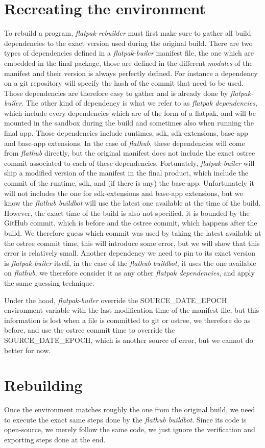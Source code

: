 \documentclass[a4paper,11pt,oneside]{report}
\newcommand{\sysname}{\emph{flatpak-rebuilder}\xspace}
\newcommand{\fh}{\emph{flathub}\xspace}
\newcommand{\fb}{\emph{flatpak-builer}\xspace}
\newcommand{\fdp}{\emph{flatpak dependencies}\xspace}
\newcommand{\sde}{SOURCE\_DATE\_EPOCH\xspace}
\newcommand{\fhbb}{\emph{flathub buildbot}\xspace}
\begin{document}
\section{Recreating the environment}
To rebuild a program, \sysname must first make sure to gather all build
dependencies to the exact version used during the original build. There are two
types of dependencies defined in a \fb manifest file, the one which are
embedded in the final package, those are defined in the different
\emph{modules} of the manifest and their version is always perfectly defined.
For instance a dependency on a git repository will specify the hash of the
commit that need to be used. Those dependencies are therefore easy to gather
and is already done by \fb.
The other kind of dependency is what we refer to as \fdp, which include every
dependencies which are of the form of a flatpak, and will be mounted in the
sandbox during the build and sometimes also when running the final app. Those
dependencies include runtimes, sdk, sdk-extensions, base-app and base-app
extensions. In the case of \fh, these dependencies will come from \fh directly,
but the original manifest does not include the exact ostree commit associated
to each of these dependencies.
Fortunately, \fb will ship a modified version of the manifest in the final
product, which include the commit of the runtime, sdk, and (if there is any)
the base-app. Unfortunately it will not includes the one for sdk-extensions and
base-app extensions, but we know the \fhbb will use the latest one
available at the time of the build. However, the exact time of the build is
also not specified, it is bounded by the GitHub commit, which is before and the
ostree commit, which happens after the build.
We therefore guess which commit was used by taking the latest available at the
ostree commit time, this will introduce some error, but we will show that this
error is relatively small.
Another dependency we need to pin to its exact version is \fb itself, in the
case of the \fhbb, it uses the one available on \fh, we therefore
consider it as any other \fdp, and apply the same guessing technique.

Under the hood, \fb override the \sde environment variable with the last
modification time of the manifest file, but this information is lost when a
file is committed to git or ostree, we therefore do as before, and use the
ostree commit time to override the \sde, which is another source of error, but
we cannot do better for now.

\section{Rebuilding}
Once the environment matches roughly the one from the original build, we need
to execute the exact same steps done by the \fhbb. Since its code is
open-source, we merely follow the same code, we just ignore the verification
and exporting steps done at the end.
\end{document}
